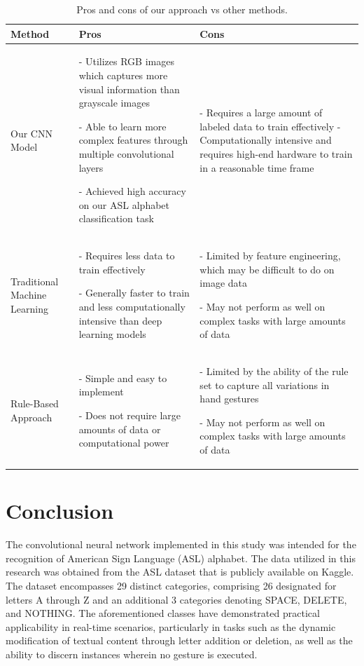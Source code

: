 \documentclass[conference]{IEEEtran}
\begin{document}
\begin{table}[!t]
\caption{Pros and cons of our approach vs other methods.}
\label{table:comparison}
\centering
\begin{tabular}{|p{2cm}|p{3.5cm}|p{3.5cm}|}
\hline
\textbf{Method} & \textbf{Pros} & \textbf{Cons} \\
\hline
Our CNN Model & - Utilizes RGB images which captures more visual information than grayscale images

- Able to learn more complex features through multiple convolutional layers 

- Achieved high accuracy on our ASL alphabet classification task & - Requires a large amount of labeled data to train effectively 
- Computationally intensive and requires high-end hardware to train in a reasonable time frame\\
\hline
Traditional Machine Learning & - Requires less data to train effectively 

- Generally faster to train and less computationally intensive than deep learning models & - Limited by feature engineering, which may be difficult to do on image data 

- May not perform as well on complex tasks with large amounts of data\\
\hline
Rule-Based Approach & - Simple and easy to implement 

- Does not require large amounts of data or computational power & - Limited by the ability of the rule set to capture all variations in hand gestures 

- May not perform as well on complex tasks with large amounts of data\\
\hline
\end{tabular}
\end{table}


\section{Conclusion}
The convolutional neural network implemented in this study was intended for the recognition of American Sign Language (ASL) alphabet. The data utilized in this research was obtained from the ASL dataset that is publicly available on Kaggle. The dataset encompasses 29 distinct categories, comprising 26 designated for letters A through Z and an additional 3 categories denoting SPACE, DELETE, and NOTHING. The aforementioned classes have demonstrated practical applicability in real-time scenarios, particularly in tasks such as the dynamic modification of textual content through letter addition or deletion, as well as the ability to discern instances wherein no gesture is executed.
\end{document}
